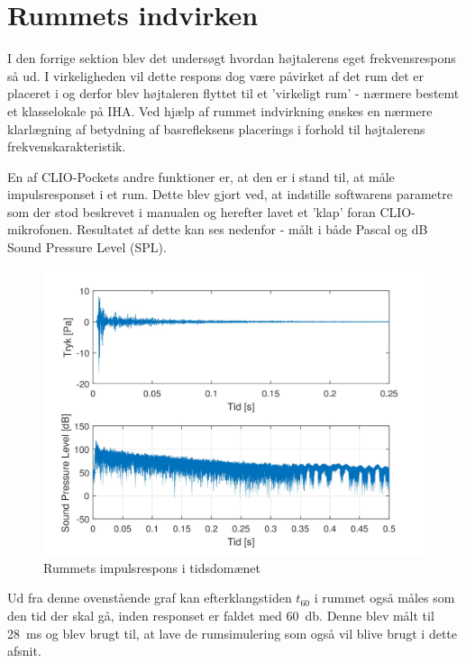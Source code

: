 \newpage
\section{Rummets indvirken}
I den forrige sektion blev det undersøgt hvordan højtalerens eget frekvensrespons så ud. I virkeligheden vil dette respons dog være påvirket af det rum det er placeret i og derfor blev højtaleren flyttet til et 'virkeligt rum' - nærmere bestemt et klasselokale på IHA. Ved hjælp af rummet indvirkning ønskes en nærmere klarlægning af betydning af basrefleksens placerings i forhold til højtalerens frekvenskarakteristik.

En af CLIO-Pockets andre funktioner er, at den er i stand til, at måle impulsresponset i et rum. Dette blev gjort ved, at indstille softwarens parametre som der stod beskrevet i manualen og herefter lavet et 'klap' foran CLIO-mikrofonen. Resultatet af dette kan ses nedenfor - målt i både Pascal og dB Sound Pressure Level (SPL).
\begin{figure}[H]
	\centering
	\vspace{-12pt}
	\includegraphics[width=\textwidth]{Billeder/Grafer/ImpulsResponse}
	\caption{Rummets impulsrespons i tidsdomænet}
\end{figure}

Ud fra denne ovenstående graf kan efterklangstiden $t_{60}$ i rummet også måles som den tid der skal gå, inden responset er faldet med \SI{60}{\decibel}. Denne blev målt til \SI{28}{\milli\second} og blev brugt til, at lave de rumsimulering som også vil blive brugt i dette afsnit.


